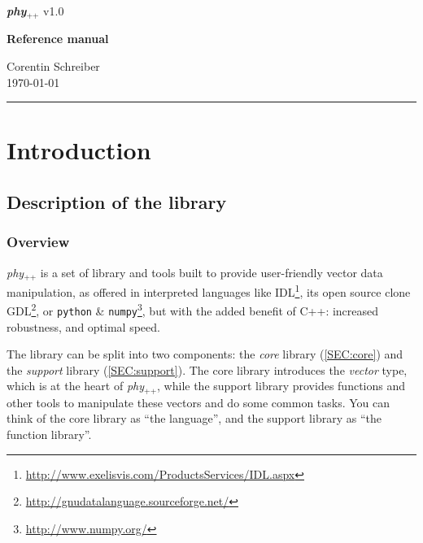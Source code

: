 \documentclass[12pt]{report}
\newcommand{\phypp}{\textit{phy}$_{\text{++}}$\xspace}
\begin{document}
\begin{titlepage}

{\noindent \Huge \textbf{\phypp} \Large v1.0 \\[0.6cm]} \par
\noindent
\vspace{2cm}
\begin{center}
\Huge \textbf{Reference manual}
\end{center}
\null\vfill
\vspace*{1cm}
\hfill
\begin{minipage}{0.35\linewidth}
    \begin{flushright}
        \large Corentin Schreiber \\
        \today
    \end{flushright}
\end{minipage}
%
\begin{minipage}{0.02\linewidth}
    \rule{1pt}{40pt}
\end{minipage}
\end{titlepage}

\tableofcontents

\chapter{Introduction \label{SEC:intro}}

\section{Description of the library \label{SEC:intro:overview}}

\subsection{Overview}

\phypp is a set of library and tools built to provide user-friendly vector data manipulation, as offered in interpreted languages like IDL\footnote{\url{http://www.exelisvis.com/ProductsServices/IDL.aspx}}, its open source clone GDL\footnote{\url{http://gnudatalanguage.sourceforge.net/}}, or \texttt{python} \& \texttt{numpy}\footnote{\url{http://www.numpy.org/}}, but with the added benefit of C++: increased robustness, and optimal speed.

The library can be split into two components: the \emph{core} library (\ref{SEC:core}) and the \emph{support} library (\ref{SEC:support}). The core library introduces the \emph{vector} type, which is at the heart of \phypp, while the support library provides functions and other tools to manipulate these vectors and do some common tasks. You can think of the core library as ``the language'', and the support library as ``the function library''.
\end{document}
